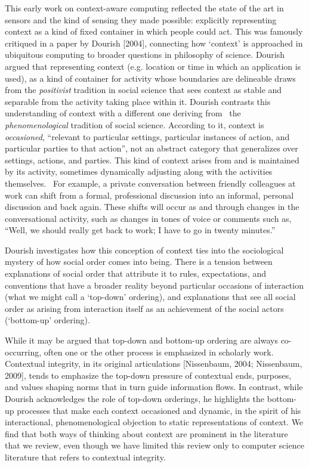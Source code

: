 \documentclass[../thesis.tex]{subfiles}
\begin{document}
This early work on context-aware computing reflected the state of the
art in sensors and the kind of sensing they made possible: explicitly
representing context as a kind of fixed container in which people could
act. This was famously critiqued in a paper by Dourish [2004],
connecting how `context' is approached
in ubiquitous computing to broader questions in philosophy of science.
Dourish argued that representing context (e.g. location or time in
which an application is used), as a kind of container for activity
whose boundaries are delineable draws from the \textit{positivist}
tradition in social science that sees context as stable and separable
from the activity taking place within it. Dourish contrasts this
understanding of context with a different one deriving from \ the
\textit{phenomenological }tradition of social science. According to it,
context is \textit{occasioned}, ``relevant to
particular settings, particular instances of action, and particular
parties to that action'', not an abstract category
that generalizes over settings, actions, and parties. This kind of
context arises from and is maintained by its activity, sometimes
dynamically adjusting along with the activities themselves. \ For
example, a private conversation between friendly colleagues at work can
shift from a formal, professional discussion into an informal, personal
discussion and back again. These shifts will occur as and through
changes in the conversational activity, such as changes in tones of
voice or comments such as, ``Well, we should really
get back to work; I have to go in twenty minutes.''


\bigskip

Dourish investigates how this conception of context ties into the
sociological mystery of how social order comes into being. There is a
tension between explanations of social order that attribute it to
rules, expectations, and conventions that have a broader reality beyond
particular occasions of interaction (what we might call a
`top-down' ordering), and explanations
that see all social order as arising from interaction itself as an
achievement of the social actors
(`bottom-up' ordering).

While it may be argued that top-down and bottom-up ordering are always
co-occurring, often one or the other process is emphasized in scholarly
work. Contextual integrity, in its original articulations [Nissenbaum,
2004; Nissenbaum, 2009], tends to emphasize the top-down pressure of
contextual ends, purposes, and values shaping norms that in turn guide
information flows. In contrast, while Dourish acknowledges the role of
top-down orderings, he highlights the bottom-up processes that make
each context occasioned and dynamic, in the spirit of his
interactional, phenomenological objection to static representations of
context. We find that both ways of thinking about context are prominent
in the literature that we review, even though we have limited this
review only to computer science literature that refers to contextual
integrity. 
\end{document}
